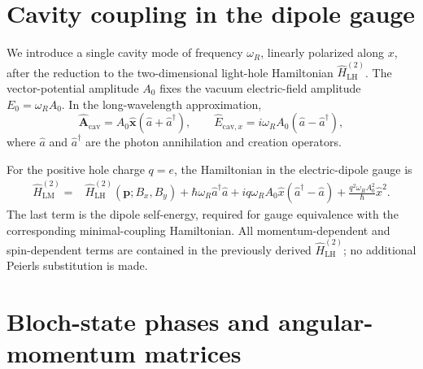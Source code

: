 \documentclass[10pt,letterpaper]{article}
\renewcommand{\thesection}{\Roman{section}}
\newcommand{\LH}{\mathrm{LH}}
\begin{document}
\section{Cavity coupling in the dipole gauge}
\label{sec:cavity}

We introduce a single cavity mode of frequency $\omega_R$,
linearly polarized along $x$, after the reduction to the
two-dimensional light-hole Hamiltonian $\hat H_{\LH}^{(2)}$.
The vector-potential amplitude $A_0$ fixes the vacuum
electric-field amplitude $E_0=\omega_R A_0$. In the
long-wavelength approximation,
\begin{equation}
\hat{\bm A}_{\mathrm{cav}}
=A_0\hat{\bm x}(\hat a+\hat a^\dagger),
\qquad
\hat E_{\mathrm{cav},x}
=i\omega_R A_0(\hat a-\hat a^\dagger),
\label{eq:cavity-field}
\end{equation}
where $\hat a$ and $\hat a^\dagger$ are the photon
annihilation and creation operators.

For the positive hole charge $q=e$, the Hamiltonian
in the electric-dipole gauge is
\begin{align}
\hat H_{\mathrm{LM}}^{(2)}
={}&\hat H_{\LH}^{(2)}(\bm p;B_x,B_y)
+\hbar\omega_R\hat a^\dagger\hat a+iq\omega_R A_0\hat x(\hat a^\dagger - \hat a)
+\frac{q^2\omega_R A_0^2}{\hbar}\hat x^2.
\label{eq:LH-cavity-dipole}
\end{align}
The last term is the dipole self-energy, required
for gauge equivalence with the corresponding
minimal-coupling Hamiltonian. All momentum-dependent
and spin-dependent terms are contained in the
previously derived $\hat H_{\LH}^{(2)}$; no additional
Peierls substitution is made.















\newpage
\appendix
\renewcommand{\thesection}{\Alph{section}}
\titleformat{\section}{\centering\normalfont\small\bfseries}{APPENDIX \thesection:}{0.6em}{\MakeUppercase}

\section{Bloch-state phases and angular-momentum matrices}
\label{app:phases}
\end{document}
